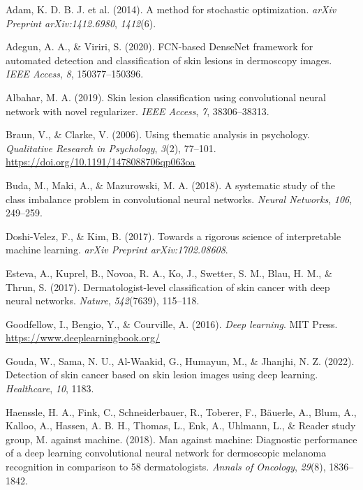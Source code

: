 \documentclass[
  12pt,
  oneside]{article}
\newlength{\cslhangindent}
\newenvironment{CSLReferences}[2] %
 {\begin{list}{}{%
  \setlength{\itemindent}{0pt}
  \setlength{\leftmargin}{0pt}
  \setlength{\parsep}{0pt}
  \ifodd #1
   \setlength{\leftmargin}{\cslhangindent}
   \setlength{\itemindent}{-1\cslhangindent}
  \fi
  \setlength{\itemsep}{#2\baselineskip}}}
 {\end{list}}
\begin{document}
\label{refs}
\begin{CSLReferences}{1}{0}
Adam, K. D. B. J. et al. (2014). A method for stochastic optimization.
\emph{arXiv Preprint arXiv:1412.6980}, \emph{1412}(6).

Adegun, A. A., \& Viriri, S. (2020). FCN-based DenseNet framework for
automated detection and classification of skin lesions in dermoscopy
images. \emph{IEEE Access}, \emph{8}, 150377--150396.

Albahar, M. A. (2019). Skin lesion classification using convolutional
neural network with novel regularizer. \emph{IEEE Access}, \emph{7},
38306--38313.

Braun, V., \& Clarke, V. (2006). Using thematic analysis in psychology.
\emph{Qualitative Research in Psychology}, \emph{3}(2), 77--101.
\url{https://doi.org/10.1191/1478088706qp063oa}

Buda, M., Maki, A., \& Mazurowski, M. A. (2018). A systematic study of
the class imbalance problem in convolutional neural networks.
\emph{Neural Networks}, \emph{106}, 249--259.

Doshi-Velez, F., \& Kim, B. (2017). Towards a rigorous science of
interpretable machine learning. \emph{arXiv Preprint arXiv:1702.08608}.

Esteva, A., Kuprel, B., Novoa, R. A., Ko, J., Swetter, S. M., Blau, H.
M., \& Thrun, S. (2017). Dermatologist-level classification of skin
cancer with deep neural networks. \emph{Nature}, \emph{542}(7639),
115--118.

Goodfellow, I., Bengio, Y., \& Courville, A. (2016). \emph{Deep
learning}. MIT Press. \url{https://www.deeplearningbook.org/}

Gouda, W., Sama, N. U., Al-Waakid, G., Humayun, M., \& Jhanjhi, N. Z.
(2022). Detection of skin cancer based on skin lesion images using deep
learning. \emph{Healthcare}, \emph{10}, 1183.

Haenssle, H. A., Fink, C., Schneiderbauer, R., Toberer, F., Bäuerle, A.,
Blum, A., Kalloo, A., Hassen, A. B. H., Thomas, L., Enk, A., Uhlmann,
L., \& Reader study group, M. against machine. (2018). Man against
machine: Diagnostic performance of a deep learning convolutional neural
network for dermoscopic melanoma recognition in comparison to 58
dermatologists. \emph{Annals of Oncology}, \emph{29}(8), 1836--1842.


\end{CSLReferences}
\end{document}
